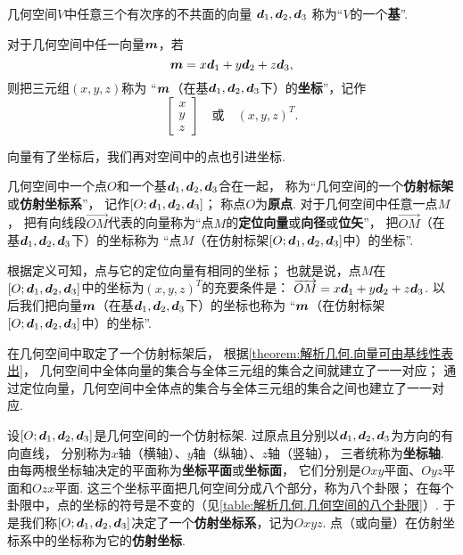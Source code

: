 \begin{definition}
几何空间\(V\)中任意三个有次序的不共面的向量
\(\boldsymbol{d}_1,\boldsymbol{d}_2,\boldsymbol{d}_3\)
称为“\(V\)的一个\textbf{基}”.

对于几何空间中任一向量\(\boldsymbol{m}\)，若\[
\boldsymbol{m} = x \boldsymbol{d}_1 + y \boldsymbol{d}_2 + z \boldsymbol{d}_3,
\]
则把三元组\((x,y,z)\)称为
“\(\boldsymbol{m}\)（在基\(\boldsymbol{d}_1,\boldsymbol{d}_2,\boldsymbol{d}_3\)下）的\textbf{坐标}”，记作\[
\begin{bmatrix} x \\ y \\ z \end{bmatrix}
\quad\text{或}\quad
(x,y,z)^T.
\]
\end{definition}

向量有了坐标后，我们再对空间中的点也引进坐标.

\begin{definition}
几何空间中一个点\(O\)和一个基\(\boldsymbol{d}_1,\boldsymbol{d}_2,\boldsymbol{d}_3\)合在一起，
称为“几何空间的一个\textbf{仿射标架}或\textbf{仿射坐标系}”，
记作\([O;\boldsymbol{d}_1,\boldsymbol{d}_2,\boldsymbol{d}_3]\)；
称点\(O\)为\textbf{原点}.
对于几何空间中任意一点\(M\)，
把有向线段\(\vec{OM}\)代表的向量称为“点\(M\)的\textbf{定位向量}或\textbf{向径}或\textbf{位矢}”，
把\(\vec{OM}\)（在基\(\boldsymbol{d}_1,\boldsymbol{d}_2,\boldsymbol{d}_3\)下）的坐标称为
“点\(M\)（在仿射标架\([O;\boldsymbol{d}_1,\boldsymbol{d}_2,\boldsymbol{d}_3]\)中）的坐标”.
\end{definition}

根据定义可知，点与它的定位向量有相同的坐标；
也就是说，点\(M\)在\([O;\boldsymbol{d}_1,\boldsymbol{d}_2,\boldsymbol{d}_3]\)中的坐标为\((x,y,z)^T\)的充要条件是：
\(\overrightarrow{OM} = x \boldsymbol{d}_1 + y \boldsymbol{d}_2 + z \boldsymbol{d}_3\).
以后我们把向量\(\boldsymbol{m}\)（在基\(\boldsymbol{d}_1,\boldsymbol{d}_2,\boldsymbol{d}_3\)下）的坐标也称为
“\(\boldsymbol{m}\)（在仿射标架\([O;\boldsymbol{d}_1,\boldsymbol{d}_2,\boldsymbol{d}_3]\)中）的坐标”.

在几何空间中取定了一个仿射标架后，
根据\cref{theorem:解析几何.向量可由基线性表出}，
几何空间中全体向量的集合与全体三元组的集合之间就建立了一一对应；
通过定位向量，几何空间中全体点的集合与全体三元组的集合之间也建立了一一对应.

设\([O;\boldsymbol{d}_1,\boldsymbol{d}_2,\boldsymbol{d}_3]\)是几何空间的一个仿射标架.
过原点且分别以\(\boldsymbol{d}_1,\boldsymbol{d}_2,\boldsymbol{d}_3\)为方向的有向直线，
分别称为\(x\)轴（横轴）、\(y\)轴（纵轴）、\(z\)轴（竖轴），
三者统称为\textbf{坐标轴}.
由每两根坐标轴决定的平面称为\textbf{坐标平面}或\textbf{坐标面}，
它们分别是\(Oxy\)平面、\(Oyz\)平面和\(Ozx\)平面.
这三个坐标平面把几何空间分成八个部分，称为八个卦限；
在每个卦限中，点的坐标的符号是不变的（见\cref{table:解析几何.几何空间的八个卦限}）.
于是我们称\([O;\boldsymbol{d}_1,\boldsymbol{d}_2,\boldsymbol{d}_3]\)决定了一个\textbf{仿射坐标系}，记为\(Oxyz\).
点（或向量）在仿射坐标系中的坐标称为它的\textbf{仿射坐标}.

